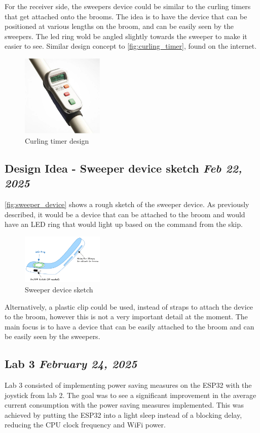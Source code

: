 \documentclass{article}
\newcommand{\logbookentry}[2]{
    \subsection*{#1 \hfill \textit{#2}} 
}
\begin{document}
For the receiver side, the sweepers device could be similar to the curling timers that get attached onto the brooms. The idea is to have the device that can be positioned at various lengths on the broom, and can be easily seen by the sweepers. The led ring wold be angled slightly towards the sweeper to make it easier to see. Similar design concept to \autoref{fig:curling_timer}, found on the internet.
\begin{figure}
    \centering
    \includegraphics[width=0.35\textwidth]{curling timer.png}
    \caption{Curling timer design}
    \label{fig:curling_timer}
\end{figure}

\logbookentry{Design Idea - Sweeper device sketch}{Feb 22, 2025}

\autoref{fig:sweeper_device} shows a rough sketch of the sweeper device. As previously described, it would be a device that can be attached to the broom and would have an LED ring that would light up based on the command from the skip. 

\begin{figure}[ht!]
    \centering
    \includegraphics[width=0.35\textwidth]{sweeper_device.png}
    \caption{Sweeper device sketch}
    \label{fig:sweeper_device}
\end{figure}

Alternatively, a plastic clip could be used, instead of straps to attach the device to the broom, however this is not a very important detail at the moment. The main focus is to have a device that can be easily attached to the broom and can be easily seen by the sweepers.


\logbookentry{Lab 3}{February 24, 2025}
Lab 3 consisted of implementing power saving measures on the ESP32 with the joystick from lab 2. The goal was to see a significant improvement in the average current consumption with the power saving measures implemented. This was achieved by putting the ESP32 into a light sleep instead of a blocking delay, reducing the CPU clock frequency and WiFi power.
\end{document}
